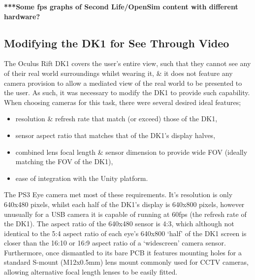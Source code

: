 \textbf{***Some fps graphs of Second Life/OpenSim content with different hardware?}


\subsection{Modifying the DK1 for See Through Video}
\label{modifying-dk1}
The Oculus Rift DK1 covers the user's entire view, such that they cannot see any of their real world surroundings whilst wearing it, \& it does not feature any camera provision to allow a mediated view of the real world to be presented to the user. As such, it was necessary to modify the DK1 to provide such capability. When choosing cameras for this task, there were several desired ideal features;
\begin{itemize}
	\item resolution \& refresh rate that match (or exceed) those of the DK1,
	\item sensor aspect ratio that matches that of the DK1's display halves,
	\item combined lens focal length \& sensor dimension to provide wide FOV (ideally matching the FOV of the DK1),
	\item ease of integration with the Unity platform.
\end{itemize}

The PS3 Eye camera met most of these requirements. It's resolution is only 640x480 pixels, whilst each half of the DK1's display is 640x800 pixels, however unusually for a USB camera it is capable of running at 60fps (the refresh rate of the DK1). The aspect ratio of the 640x480 sensor is 4:3, which although not identical to the 5:4 aspect ratio of each eye's 640x800 `half' of the DK1 screen is closer than the 16:10 or 16:9 aspect ratio of a `widescreen' camera sensor. Furthermore, once dismantled to its bare PCB it features mounting holes for a standard S-mount (M12x0.5mm) lens mount commonly used for CCTV cameras, allowing alternative focal length lenses to be easily fitted.

